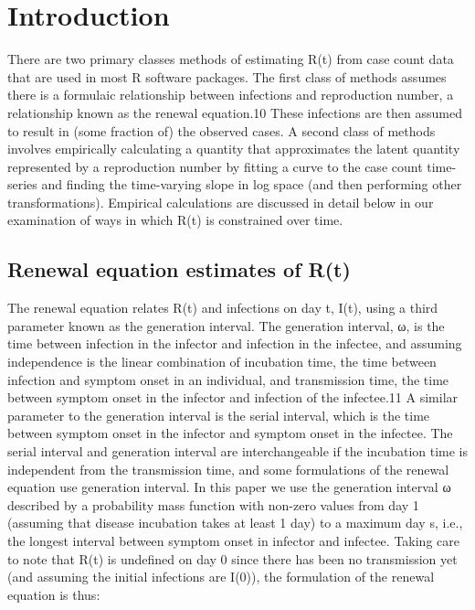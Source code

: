 \documentclass[
  letterpaper,
  DIV=11,
  numbers=noendperiod]{scrreprt}
\begin{document}

\chapter{Introduction}\label{introduction}

There are two primary classes methods of estimating R(t) from case count
data that are used in most R software packages. The first class of
methods assumes there is a formulaic relationship between infections and
reproduction number, a relationship known as the renewal equation.10
These infections are then assumed to result in (some fraction of) the
observed cases. A second class of methods involves empirically
calculating a quantity that approximates the latent quantity represented
by a reproduction number by fitting a curve to the case count
time-series and finding the time-varying slope in log space (and then
performing other transformations). Empirical calculations are discussed
in detail below in our examination of ways in which R(t) is constrained
over time.

\section{Renewal equation estimates of
R(t)}\label{renewal-equation-estimates-of-rt}

The renewal equation relates R(t) and infections on day t, I(t), using a
third parameter known as the generation interval. The generation
interval, ω, is the time between infection in the infector and infection
in the infectee, and assuming independence is the linear combination of
incubation time, the time between infection and symptom onset in an
individual, and transmission time, the time between symptom onset in the
infector and infection of the infectee.11 A similar parameter to the
generation interval is the serial interval, which is the time between
symptom onset in the infector and symptom onset in the infectee. The
serial interval and generation interval are interchangeable if the
incubation time is independent from the transmission time, and some
formulations of the renewal equation use generation interval. In this
paper we use the generation interval ω described by a probability mass
function with non-zero values from day 1 (assuming that disease
incubation takes at least 1 day) to a maximum day s, i.e., the longest
interval between symptom onset in infector and infectee. Taking care to
note that R(t) is undefined on day 0 since there has been no
transmission yet (and assuming the initial infections are I(0)), the
formulation of the renewal equation is thus:
\end{document}
